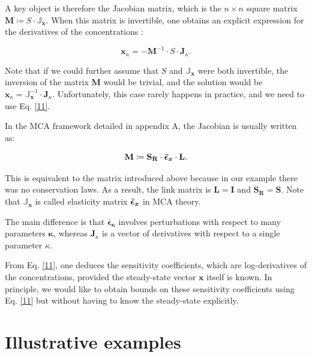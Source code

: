 \documentclass{article}
\begin{document}
	A key object is therefore the Jacobian matrix, which is the $n \times n$ square matrix $\mathbf{M} \coloneqq S \cdot \mathbb{J}_{\mathbf{x}}$.
	When this matrix is invertible, one obtains 
	an explicit expression for 
	the derivatives of the concentrations :
	\begin{center}
		\begin{equation}
			\mathbf{x}_{\kappa} = - \mathbf{M} ^ {-1} \cdot S \cdot \mathbf{J}_{\kappa}.
			\label{11}
		\end{equation}
	\end{center}
	Note that if we could further assume that $S$ and ${\mathbb{J}}_{\mathbf{x}}$ were both invertible, the inversion of the matrix $\mathbf{M}$ would be trivial, and
	the solution would be
	$\mathbf{x}_{\kappa} =  {\mathbb{J}}_{\mathbf{x}}^ {-1} \cdot \mathbf{J}_{\kappa}$. Unfortunately, this case rarely happens in practice, and we need to use Eq. \eqref{11}.
	
	In the MCA framework detailed in appendix A, the Jacobian is usually written as:
	\begin{center}
		\begin{equation}
			\mathbf{M}\coloneqq \mathbf{S_R} \cdot \bm{\Bar{\epsilon}_x} \cdot \mathbf{L}.
		\end{equation}
	\end{center}
	This is equivalent to the matrix introduced above because in our example there was no conservation laws. As a result, the link matrix is $\mathbf{L}= \mathbf{I}$ and $\mathbf{S_R}= \mathbf{S}$. Note that  $\mathbb{J}_{\mathbf{x}}$ is called elasticity matrix $\bm{\Bar{\epsilon}_x}$ in MCA theory. 
	
	The main difference is that  $\bm{\bar{\epsilon}}_{\pmb{\kappa}}$ involves perturbations with respect to many parameters $\pmb{\kappa}$, whereas $\mathbf{J}_{\kappa}$ is a vector of derivatives with respect to a single parameter $\kappa$. 
	
	From Eq. \eqref{11}, one deduces the sensitivity coefficients, which are log-derivatives of the concentrations, provided the steady-state vector $\mathbf{x}$ itself is known. In principle, we would like to obtain bounds on these sensitivity coefficients using Eq. \eqref{11} but without having to know the steady-state explicitly.
	
	
	\section{Illustrative examples}
	
\end{document}

